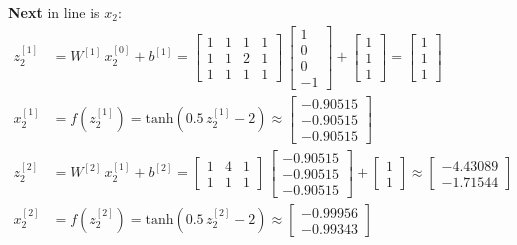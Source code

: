 \documentclass[12pt]{article}
\begin{document}
\begin{enumerate}[leftmargin=\labelsep]
          \vskip -0.2cm
          \textbf{Next} in line is $x_2$:
            \begingroup
            \allowdisplaybreaks
            \begin{align*}
                z^{[1]}_2 &= {W}^{[1]} \, {x}^{[0]}_2 + {b}^{[1]} = \begin{bmatrix} 1 & 1 & 1 & 1 \\ 1 & 1 & 2 & 1 \\ 1 & 1 & 1 & 1\end{bmatrix} \,  \begin{bmatrix} 1 \\ 0 \\ 0 \\ -1 \end{bmatrix} +
                \begin{bmatrix} 1 \\ 1 \\ 1\end{bmatrix} = \begin{bmatrix} 1 \\ 1 \\ 1\end{bmatrix} \\
                {x}^{[1]}_2 &= f\left({z}^{[1]}_2\right) = \text{tanh}\left(0.5\,{z}^{[1]}_2 - 2\right) \approx \begin{bmatrix} -0.90515 \\ -0.90515 \\ -0.90515\end{bmatrix} \\
                z^{[2]}_2 &= {W}^{[2]} \, {x}^{[1]}_2 + {b}^{[2]} = \begin{bmatrix} 1 & 4 & 1 \\ 1 & 1 & 1\end{bmatrix} \,  \begin{bmatrix} -0.90515 \\ -0.90515 \\ -0.90515 \end{bmatrix} +
                \begin{bmatrix} 1 \\ 1\end{bmatrix} \approx \begin{bmatrix} -4.43089 \\ -1.71544\end{bmatrix} \\
                {x}^{[2]}_2 &= f\left({z}^{[2]}_2\right) = \text{tanh}\left(0.5\,{z}^{[2]}_2 - 2\right) \approx \begin{bmatrix} -0.99956 \\ -0.99343\end{bmatrix} \\

\end{align*}
\end{enumerate}
\end{document}
